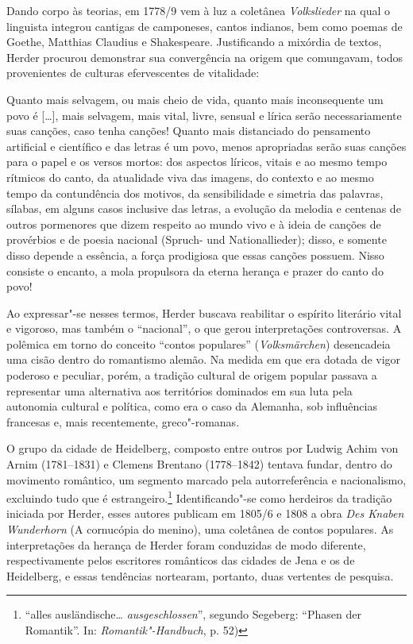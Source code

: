 Dando corpo às teorias, em 1778/9 vem à luz a coletânea \textit{Volkslieder} na
qual o linguista integrou cantigas de camponeses, cantos indianos, bem
como poemas de Goethe, Matthias Claudius e Shakespeare. Justificando a
mixórdia de textos, Herder procurou demonstrar sua convergência na
origem que comungavam, todos provenientes de culturas efervescentes 
de vitalidade:

\begin{hedraquote}
Quanto mais selvagem, ou mais cheio de vida, quanto mais inconsequente
um povo é [\ldots], mais selvagem, mais vital, livre, sensual e lírica
serão necessariamente suas canções, caso tenha canções! Quanto mais
distanciado do pensamento artificial e científico e das letras é um
povo, menos apropriadas serão suas canções para o papel e os versos
mortos: dos aspectos líricos, vitais e ao mesmo tempo rítmicos do
canto, da atualidade viva das imagens, do contexto e ao mesmo tempo da
contundência dos motivos, da sensibilidade e simetria das palavras,
sílabas, em alguns casos inclusive das letras, a evolução da melodia e
centenas de outros pormenores que dizem respeito ao mundo vivo e à
ideia de canções de provérbios e de poesia nacional (Spruch- und
Nationallieder); disso, e somente disso depende a essência, a força
prodigiosa que essas canções possuem. Nisso consiste o encanto, a mola
propulsora da eterna herança e prazer do canto do povo!
\end{hedraquote}


Ao expressar"-se nesses termos, Herder buscava reabilitar o espírito
literário vital e vigoroso, mas também o ``nacional'', o que gerou
interpretações controversas. A polêmica em torno do conceito ``contos
populares'' (\textit{Volksmärchen}) desencadeia uma cisão dentro 
do romantismo alemão. Na medida em que era dotada de vigor poderoso 
e peculiar, porém, a tradição cultural de origem popular passava a 
representar uma alternativa aos territórios dominados em sua luta 
pela autonomia cultural e política, como era o caso da Alemanha, 
sob influências francesas e, mais recentemente, greco"-romanas.

O grupo da cidade de Heidelberg, composto entre outros por Ludwig Achim
von Arnim (1781--1831) e Clemens Brentano (1778--1842) tentava fundar,
dentro do movimento romântico, um segmento marcado pela autorreferência
e nacionalismo, excluindo tudo que é estrangeiro.\footnote{ ``alles
ausländische\ldots{} \textit{ausgeschlossen}'', segundo Segeberg: ``Phasen der
Romantik''. In: \textit{Romantik"-Handbuch}, p. 52)} Identificando"-se
como herdeiros da tradição iniciada por Herder, esses autores publicam
em 1805/6 e 1808 a obra \textit{Des Knaben Wunderhorn} (A cornucópia
do menino), uma coletânea de contos populares. As interpretações da
herança de Herder foram conduzidas de modo diferente, respectivamente
pelos escritores românticos das cidades de Jena e os de Heidelberg, e
essas tendências nortearam, portanto, duas vertentes de pesquisa. 

